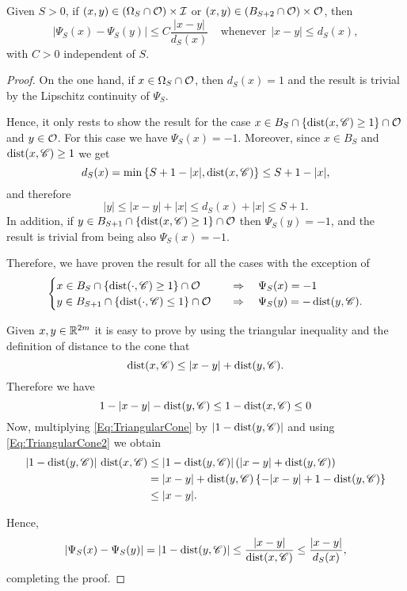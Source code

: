 \begin{lemma}
\label{Lemma: AdaptedLipschitzConditionWith_dFunction}
Given $S>0$, if $(x,y) \in \left(\Omega_S\cap \mathcal{O}\right) \times \mathcal{I}$ or $(x,y)\in \left(B_{S+2}\cap \mathcal{O}\right) \times \mathcal{O}$, then
$$ |\Psi_S(x) - \Psi_S(y)| \leq C \frac{|x-y|}{d_S(x)} \ \ \ \ \ \textrm{whenever} \ \ |x-y|\leq d_S(x), $$
with $C>0$ independent of $S$.
\end{lemma}

\begin{proof}
On the one hand, if $x\in \Omega_S \cap \mathcal{O}$, then $d_S(x)=1$ and the result is trivial by the Lipschitz continuity of $\Psi_S$.

Hence, it only rests to show the result for the case $x\in B_S\cap \{\operatorname{dist}(x,\mathscr{C})\geq 1\} \cap \mathcal{O}$ and $y\in \mathcal{O}$. For this case we have $\Psi_S(x)=-1$. Moreover, since $x\in B_S$ and $\operatorname{dist}(x,\mathscr{C})\geq 1$ we get
$$ d_S(x) = \min\left\{S+1-|x|,\operatorname{dist}(x,\mathscr{C})\right\} \leq S+1-|x|,$$
and therefore
$$ |y|\leq |x-y| + |x| \leq d_S(x)+|x| \leq S+1. $$
In addition, if $y\in B_{S+1} \cap \{\operatorname{dist}(x,\mathscr{C})\geq 1\}\cap \mathcal{O}$ then $\Psi_S(y)=-1$, and the
result is trivial from being also $\Psi_S(x)=-1$.

Therefore, we have proven the result for all the cases with the exception of
$$\begin{cases}
x\in B_S \cap \{\operatorname{dist}(\cdot,\mathscr{C})\geq 1\}\cap \mathcal{O} \ \ \ &\Rightarrow \ \ \ \Psi_S(x)=-1 \\
y\in B_{S+1} \cap \{\operatorname{dist}(\cdot,\mathscr{C})\leq 1\}\cap \mathcal{O} \ \ \ &\Rightarrow \ \ \ \Psi_S(y)=-\operatorname{dist}(y,\mathscr{C}). \\
\end{cases}$$

Given $x,y \in \mathbb{R}^{2m}$ it is easy to prove by using the triangular inequality and the definition of distance to the cone that
\begin{equation} \label{Eq:TriangularCone}
\operatorname{dist}(x,\mathscr{C}) \leq |x-y| + \operatorname{dist}(y,\mathscr{C}).
\end{equation}
Therefore we have
\begin{equation} \label{Eq:TriangularCone2}
1-|x-y|-\operatorname{dist}(y,\mathscr{C}) \leq 1-\operatorname{dist}(x,\mathscr{C}) \leq 0
\end{equation}
Now, multiplying \eqref{Eq:TriangularCone} by $|1-\operatorname{dist}(y,\mathscr{C})|$ and using \eqref{Eq:TriangularCone2} we obtain
\begin{align*}
|1-\operatorname{dist}(y,\mathscr{C})|\,\operatorname{dist}(x,\mathscr{C}) &\leq |1-\operatorname{dist}(y,\mathscr{C})| \left(|x-y| + \operatorname{dist}(y,\mathscr{C})\right) \\
&= |x-y|+\operatorname{dist}(y,\mathscr{C}) \left\{ -|x-y|+ 1- \operatorname{dist}(y,\mathscr{C}) \right\} \\
&\leq |x-y|.
\end{align*}

Hence,
$$ |\Psi_S(x)-\Psi_S(y)| = |1-\operatorname{dist}(y,\mathscr{C})| \leq \frac{|x-y|}{\operatorname{dist}(x,\mathscr{C})} \leq  \frac{|x-y|}{d_S(x)},$$
completing the proof.
\end{proof}

